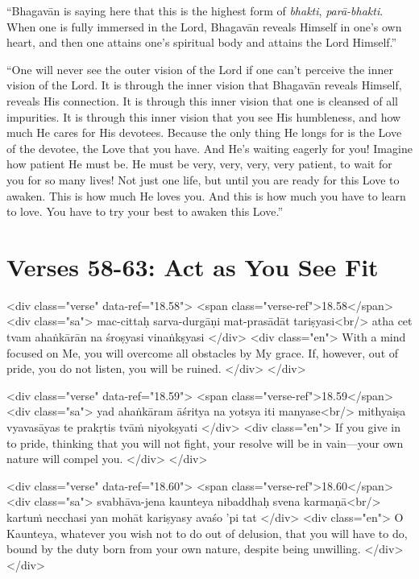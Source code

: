 \enquote{Bhagavān is saying here that this is the highest form of \textit{bhakti}, \textit{parā-bhakti}. When one is fully immersed in the Lord, Bhagavān reveals Himself in one’s own heart, and then one attains one’s spiritual body and attains the Lord Himself.}

\enquote{One will never see the outer vision of the Lord if one can’t perceive the inner vision of the Lord. It is through the inner vision that Bhagavān reveals Himself, reveals His connection. It is through this inner vision that one is cleansed of all impurities. It is through this inner vision that you see His humbleness, and how much He cares for His devotees. Because the only thing He longs for is the Love of the devotee, the Love that you have. And He’s waiting eagerly for you! Imagine how patient He must be. He must be very, very, very, very patient, to wait for you for so many lives! Not just one life, but until you are ready for this Love to awaken. This is how much He loves you. And this is how much you have to learn to love. You have to try your best to awaken this Love.}

\section{Verses 58-63: Act as You See Fit}\label{sec-verses-58-63-act-as-you-see-fit}


\begin{html}
<div class="verse" data-ref="18.58">
  <span class="verse-ref">18.58</span>
  <div class="sa">
    mac-cittaḥ sarva-durgāṇi mat-prasādāt tariṣyasi<br/>
    atha cet tvam ahaṅkārān na śroṣyasi vinaṅkṣyasi
  </div>
  <div class="en">
    With a mind focused on Me, you will overcome all obstacles by My grace. If, however, out of pride, you do not listen, you will be ruined.
  </div>
</div>
\end{html}



\begin{html}
<div class="verse" data-ref="18.59">
  <span class="verse-ref">18.59</span>
  <div class="sa">
    yad ahaṅkāram āśritya na yotsya iti manyase<br/>
    mithyaiṣa vyavasāyas te prakṛtis tvāṁ niyokṣyati
  </div>
  <div class="en">
    If you give in to pride, thinking that you will not fight, your resolve will be in vain---your own nature will compel you.
  </div>
</div>
\end{html}



\begin{html}
<div class="verse" data-ref="18.60">
  <span class="verse-ref">18.60</span>
  <div class="sa">
    svabhāva-jena kaunteya nibaddhaḥ svena karmaṇā<br/>
    kartuṁ necchasi yan mohāt kariṣyasy avaśo ’pi tat
  </div>
  <div class="en">
    O Kaunteya, whatever you wish not to do out of delusion, that you will have to do, bound by the duty born from your own nature, despite being unwilling.
  </div>
</div>
\end{html}



